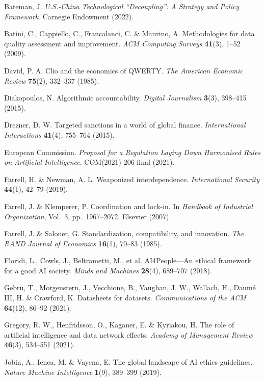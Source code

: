 \documentclass[12pt,a4paper]{article}
\theoremstyle{definition}
\theoremstyle{remark}
\begin{document}
 Bateman, J. \textit{U.S.-China Technological ``Decoupling'': A Strategy and Policy Framework}. Carnegie Endowment (2022).

 Batini, C., Cappiello, C., Francalanci, C. \& Maurino, A. Methodologies for data quality assessment and improvement. \textit{ACM Computing Surveys} \textbf{41}(3), 1--52 (2009).

 David, P. A. Clio and the economics of QWERTY. \textit{The American Economic Review} \textbf{75}(2), 332--337 (1985).

 Diakopoulos, N. Algorithmic accountability. \textit{Digital Journalism} \textbf{3}(3), 398--415 (2015).

 Drezner, D. W. Targeted sanctions in a world of global finance. \textit{International Interactions} \textbf{41}(4), 755--764 (2015).

 European Commission. \textit{Proposal for a Regulation Laying Down Harmonised Rules on Artificial Intelligence}. COM(2021) 206 final (2021).

 Farrell, H. \& Newman, A. L. Weaponized interdependence. \textit{International Security} \textbf{44}(1), 42--79 (2019).

 Farrell, J. \& Klemperer, P. Coordination and lock-in. In \textit{Handbook of Industrial Organization}, Vol.~3, pp.~1967--2072. Elsevier (2007).

 Farrell, J. \& Saloner, G. Standardization, compatibility, and innovation. \textit{The RAND Journal of Economics} \textbf{16}(1), 70--83 (1985).

 Floridi, L., Cowls, J., Beltrametti, M., et al. AI4People---An ethical framework for a good AI society. \textit{Minds and Machines} \textbf{28}(4), 689--707 (2018).

 Gebru, T., Morgenstern, J., Vecchione, B., Vaughan, J. W., Wallach, H., Daum\'e III, H. \& Crawford, K. Datasheets for datasets. \textit{Communications of the ACM} \textbf{64}(12), 86--92 (2021).

 Gregory, R. W., Henfridsson, O., Kaganer, E. \& Kyriakou, H. The role of artificial intelligence and data network effects. \textit{Academy of Management Review} \textbf{46}(3), 534--551 (2021).

 Jobin, A., Ienca, M. \& Vayena, E. The global landscape of AI ethics guidelines. \textit{Nature Machine Intelligence} \textbf{1}(9), 389--399 (2019).
\end{document}
